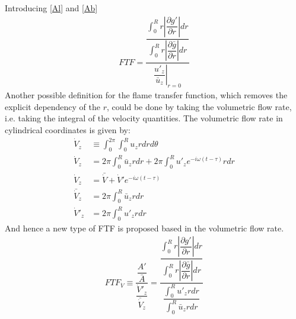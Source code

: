 Introducing \ref{Al} and \ref{Ab}
\begin{align*}
FTF= \dfrac{\dfrac{\int_0^R r \left| \dfrac{\partial g'}{\partial r} \right| dr}{\int_0^R r \left|\dfrac{\partial \bar{g}}{\partial r}\right| dr}}{ \left.\dfrac{u'_z}{\bar{u}_z}\right|_{r=0}}
\end{align*}
Another possible definition for the flame transfer function, which removes the explicit dependency of the $r$, could be done by taking the volumetric flow rate, i.e. taking the integral of the velocity quantities.
The volumetric flow rate in cylindrical coordinates is given by:
\begin{align*}
\dot{V}_z&\equiv \int_0^{2\pi} \int_0^R u_z r dr d\theta \\
\dot{V}_z&= 2 \pi \int_0^R \bar{u}_z r dr + 2\pi \int_0^R u'_z e^{-i \omega (t-\tau)}r dr \\
\dot{V}_z&= \bar{\dot{V}}  + \dot{V}'e^{-i \omega (t-\tau)}\\
\bar{\dot{V}}_z&=2 \pi \int_0^R \bar{u}_z r dr\\
\dot{V}'_z&= 2\pi \int_0^R u'_z r dr 
\end{align*}
And hence a new type of FTF is proposed based in the volumetric flow rate.
\begin{align*}
FTF_{\dot{V}}\equiv \dfrac{\dfrac{A'}{\bar{A}}}{\dfrac{\dot{V}'_z}{\bar{\dot{V}}_z}}=\dfrac{\dfrac{\int_0^R r \left| \dfrac{\partial g'}{\partial r} \right| dr}{\int_0^R r \left|\dfrac{\partial \bar{g}}{\partial r}\right| dr}}{\dfrac{\int_0^R u'_z r dr}{\int_0^R \bar{u}_z r dr}}
\end{align*}